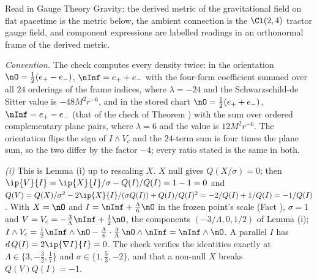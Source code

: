 Read in Gauge Theory Gravity: the derived metric of the gravitational field on flat spacetime is the metric below, the ambient connection is the $\Cl(2,4)$ tractor gauge field, and component expressions are labelled readings in an orthonormal frame of the derived metric.

\emph{Convention.} The check computes every density twice: in the orientation $\nO = \tfrac12(e_{+} - e_{-})$, $\nInf = e_{+} + e_{-}$ with the four-form coefficient summed over all $24$ orderings of the frame indices, where $\lambda = -24$ and the Schwarzschild-de Sitter value is $-48M^{2}r^{-6}$, and in the stored chart $\nO = \tfrac12(e_{+} + e_{-})$, $\nInf = e_{+} - e_{-}$ (that of the check of Theorem ) with the sum over ordered complementary plane pairs, where $\lambda = 6$ and the value is $12M^{2}r^{-6}$. The orientation flips the sign of $I \wedge V_{c}$ and the $24$-term sum is four times the plane sum, so the two differ by the factor $-4$; every ratio stated is the same in both.

\emph{(i)} This is Lemma (i) up to rescaling $X$. $X$ null gives $Q(X/\sigma) = 0$; then $\ip{V}{I} = \ip{X}{I}/\sigma - Q(I)/Q(I) = 1 - 1 = 0$ and $Q(V) = Q(X)/\sigma^{2} - 2\ip{X}{I}/(\sigma Q(I)) + Q(I)/Q(I)^{2} = -2/Q(I) + 1/Q(I) = -1/Q(I)$. With $X = \nO$ and $I = \nInf + \tfrac{\Lambda}{6}\nO$ in the frozen point's scale (Fact ), $\sigma = 1$ and $V = V_{c} = -\tfrac{3}{\Lambda}\nInf + \tfrac12\nO$, the components $(-3/\Lambda, 0, 1/2)$ of Lemma (i); $I\wedge V_{c} = \tfrac12\nInf\wedge\nO - \tfrac{\Lambda}{6}\cdot\tfrac{3}{\Lambda}\,\nO\wedge\nInf = \nInf\wedge\nO$. A parallel $I$ has $d\,Q(I) = 2\ip{\nabla I}{I} = 0$. The check verifies the identities exactly at $\Lambda \in \{3, -\tfrac32, \tfrac17\}$ and $\sigma \in \{1, \tfrac53, -2\}$, and that a non-null $X$ breaks $Q(V)Q(I) = -1$.

